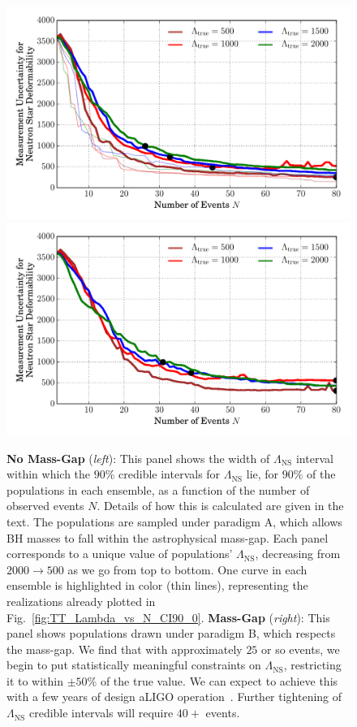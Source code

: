 \documentclass[aps,prd,amsmath,floats,floatfix, twocolumn,
superscriptaddress,nofootinbib,showpacs]{revtex4-1}
\newcommand{\lambdans}{\Lambda_\mathrm{NS}}
\begin{document}
\begin{figure}
\centering    
\includegraphics[width=1.025\columnwidth,trim=1cm 0 0 0]{LambdaCIWidths90pc_vs_N_AllPopulation}
\includegraphics[width=1.025\columnwidth,trim=0 0 1cm 0]{LambdaCIWidths90pc_vs_N_AstroPopulation}
\caption{{\bf No Mass-Gap} ({\it left}): This panel shows the width of $\lambdans$ interval within
which the $90\%$ credible intervals for $\lambdans$ lie, for $90\%$ of 
the populations in each ensemble, as a function of the number of observed events
$N$. Details of how this is calculated are given in the text.
% 
The populations are sampled under paradigm A, which allows BH masses to
fall within the astrophysical mass-gap.
Each panel corresponds to a unique value of populations' $\lambdans$,
decreasing from $2000\rightarrow 500$ as we go from top to bottom.
% 
One curve in each ensemble is highlighted in color (thin lines), representing the 
realizations already plotted in Fig.~\ref{fig:TT_Lambda_vs_N_CI90_0}.
{\bf Mass-Gap} ({\it right}): This panel shows populations drawn under paradigm B, which
respects the mass-gap.
% 
We find that with approximately $25$ or so events, we begin to put
statistically meaningful constraints on $\lambdans$, restricting it to within
$\pm 50\%$ of the true value. We can expect to achieve this with a few years
of design aLIGO operation~\cite{Abadie:2010cfa}. Further tightening of 
$\lambdans$ credible intervals will require $40+$ events.
}
\label{fig:TT_LambdaError_vs_N_L500_2000_CI90_0_AllInOne}
\end{figure}
\end{document}
